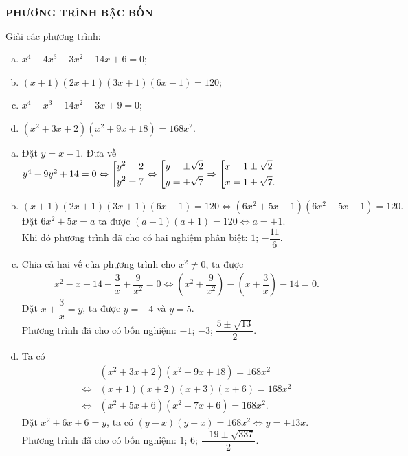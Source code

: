 \vspace{0.3cm}
\noindent \textbf{PHƯƠNG TRÌNH BẬC BỐN}
	\begin{bt}
		Giải các phương trình:
		\begin{enumerate}[a)]
			\item $x^4-4x^3-3x^2+14x+6=0$;
			\item $(x+1)(2x+1)(3x+1)(6x-1)=120$;
			\item $x^4-x^3-14x^2-3x+9=0$;
			\item $\left(x^2+3x+2\right)\left(x^2+9x+18\right) = 168x^2$.
		\end{enumerate}
		\loigiai 
		{
			\begin{enumerate}[a)]
				\item Đặt $y = x-1$. Đưa về $y^4-9y^2+14=0 \Leftrightarrow \left[\begin{aligned}&y^2=2 \\ &y^2=7\end{aligned}\right. \Leftrightarrow \left[\begin{aligned}&y=\pm \sqrt{2} \\ &y = \pm \sqrt{7}\end{aligned}\right. \Rightarrow \left[\begin{aligned}&x=1 \pm \sqrt{2} \\ &x = 1 \pm \sqrt{7}.\end{aligned}\right.$
				\item $(x+1)(2x+1)(3x+1)(6x-1)=120 \Leftrightarrow (6x^2 + 5x - 1)(6x^2 + 5x + 1) = 120.$ \\
				Đặt $6x^2 + 5x = a$ ta được $(a-1)(a+1) = 120 \Leftrightarrow a = \pm 1.$ \\
				Khi đó phương trình đã cho có hai nghiệm phân biệt: $1$; $-\dfrac{11}{6}$.
				\item Chia cả hai vế của phương trình cho $x^2 \ne 0$, ta được
					\begin{align*}
						x^2-x-14-\dfrac{3}{x}+\dfrac{9}{x^2}=0 \Leftrightarrow \left(x^2 + \dfrac{9}{x^2}\right) - \left(x + \dfrac{3}{x}\right) - 14 = 0.
					\end{align*}
				Đặt $x + \dfrac{3}{x} = y$, ta được $y = -4$ và $y = 5$. \\
				Phương trình đã cho có bốn nghiệm: $-1$; $-3$; $\dfrac{5 \pm \sqrt{13}}{2}$.
				\item Ta có 
					\begin{align*}
						&\left(x^2+3x+2\right)\left(x^2+9x+18\right) = 168x^2 \\ \Leftrightarrow &(x+1)(x+2)(x+3)(x+6) = 168x^2 \\ \Leftrightarrow &(x^2+5x+6)(x^2+7x+6)=168x^2.
					\end{align*}
					Đặt $x^2+6x+6 = y$, ta có $(y-x)(y+x) = 168x^2 \Leftrightarrow y = \pm 13x.$ \\
					Phương trình đã cho có bốn nghiệm: $1$; $6$; $\dfrac{-19 \pm \sqrt{337}}{2}.$
			\end{enumerate}
		}
	\end{bt}

